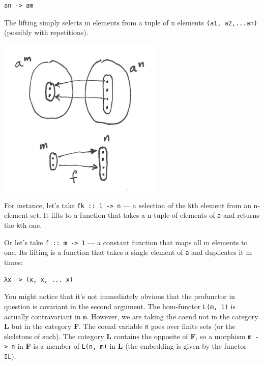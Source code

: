 \begin{verbatim}
an -> am
\end{verbatim}

The lifting simply selects m elements from a tuple of n elements
\texttt{(a1,\ a2,...an)} (possibly with repetitions).

\includegraphics[width=3.12500in]{images/liftpower.png}

For instance, let's take \texttt{fk\ ::\ 1\ -\textgreater{}\ n} --- a
selection of the \texttt{k}th element from an n-element set. It lifts to
a function that takes a n-tuple of elements of \texttt{a} and returns
the \texttt{k}th one.

Or let's take \texttt{f\ ::\ m\ -\textgreater{}\ 1} --- a constant
function that maps all m elements to one. Its lifting is a function that
takes a single element of \texttt{a} and duplicates it m times:

\begin{verbatim}
λx -> (x, x, ... x)
\end{verbatim}

You might notice that it's not immediately obvious that the profunctor
in question is covariant in the second argument. The hom-functor
\texttt{L(m,\ 1)} is actually contravariant in \texttt{m}. However, we
are taking the coend not in the category \textbf{L} but in the category
\textbf{F}. The coend variable \texttt{n} goes over finite sets (or the
skeletons of such). The category \textbf{L} contains the opposite of
\textbf{F}, so a morphism \texttt{m\ -\textgreater{}\ n} in \textbf{F}
is a member of \texttt{L(n,\ m)} in \textbf{L} (the embedding is given
by the functor \texttt{IL}).

